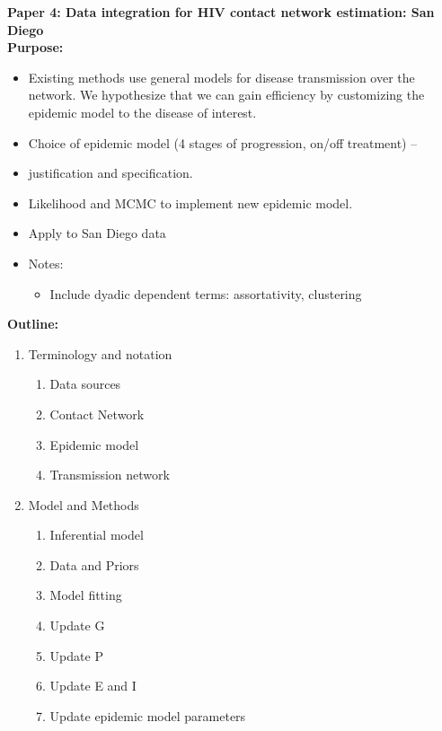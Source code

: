 {\large\textbf{Paper 4: Data integration for HIV contact network estimation: San Diego}}\\

\textbf{Purpose:}

\begin{itemize}
    \item Existing methods use general models for disease transmission over the network.  We hypothesize that we can gain efficiency by customizing the epidemic model to the disease of interest.
    \item Choice of epidemic model (4 stages of progression, on/off treatment) – \item justification and specification.
    \item Likelihood and MCMC to implement new epidemic model.
    \item Apply to San Diego data
    \item Notes:
    \begin{itemize}
        \item Include dyadic dependent terms: assortativity, clustering
    \end{itemize}
\end{itemize}

\textbf{Outline:}

\renewcommand{\labelenumi}{\arabic{enumi}.} 
\renewcommand{\labelenumii}{\arabic{enumi}.\arabic{enumii}}
\begin{enumerate}
    \item Terminology and notation

    \begin{enumerate}
        \item Data sources
        \item Contact Network
        \item Epidemic model
        \item Transmission network
    \end{enumerate}
    \item Model and Methods
    \begin{enumerate}
        \item Inferential model
        \item Data and Priors
        \item Model fitting
        \item Update G
        \item Update P
        \item Update E and I
        \item Update epidemic model parameters
    \end{enumerate}
\end{enumerate}

\renewcommand{\labelenumi}{\arabic{enumi}.} 
\renewcommand{\labelenumii}{\arabic{enumi}.\arabic{enumii}}
